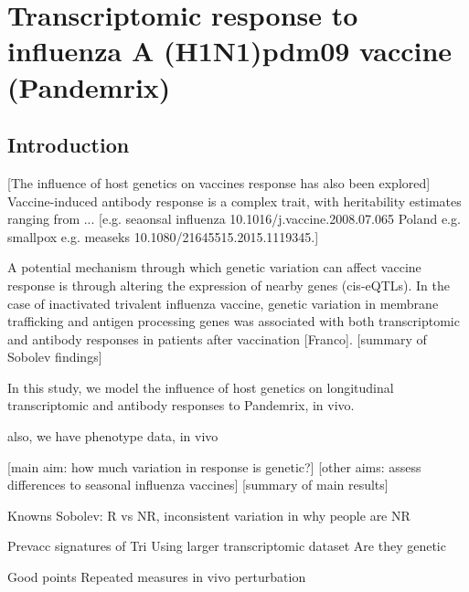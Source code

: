 %
%

\chapter{Transcriptomic response to influenza A (H1N1)pdm09 vaccine (Pandemrix)}


\section{Introduction}


[The influence of host genetics on vaccines response has also been explored]
Vaccine-induced antibody response is a complex trait, with heritability estimates ranging from ... [e.g. seaonsal influenza 10.1016/j.vaccine.2008.07.065 Poland e.g. smallpox e.g. measeks 10.1080/21645515.2015.1119345.]

A potential mechanism through which genetic variation can affect vaccine response is through altering the expression of nearby genes (cis-eQTLs).
In the case of inactivated trivalent influenza vaccine, genetic variation in membrane trafficking and antigen processing genes was associated with both transcriptomic and antibody responses in patients after vaccination [Franco].
[summary of Sobolev findings]


In this study, we model the influence of host genetics on longitudinal transcriptomic and antibody responses to Pandemrix, in vivo.

also, we have phenotype data, in vivo

[main aim: how much variation in response is genetic?]
[other aims: assess differences to seasonal influenza vaccines]
[summary of main results]

Knowns
    Sobolev: R vs NR, 
    inconsistent variation in why people are NR

Prevacc signatures of Tri
Using larger transcriptomic dataset
Are they genetic

Good points
    Repeated measures
    in vivo perturbation

